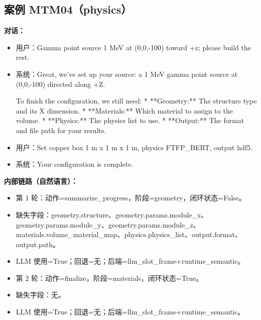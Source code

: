 \documentclass[11pt]{ctexart}
\begin{document}
\subsection{案例 MTM04（physics）}
\textbf{对话：}
\begin{itemize}
\item 用户：Gamma point source 1 MeV at (0,0,-100) toward +z; please build the rest.
\item 系统：Great, we've set up your source: a 1 MeV gamma point source at (0,0,-100) directed along +Z.

To finish the configuration, we still need:
*   **Geometry:** The structure type and its X dimension.
*   **Materials:** Which material to assign to the volume.
*   **Physics:** The physics list to use.
*   **Output:** The format and file path for your results.
\item 用户：Set copper box 1 m x 1 m x 1 m, physics FTFP\_BERT, output hdf5.
\item 系统：Your configuration is complete.
\end{itemize}
\textbf{内部链路（自然语言）：}
\begin{itemize}
\item 第 1 轮：动作=summarize\_progress，阶段=geometry，闭环状态=False。
\item 缺失字段：geometry.structure、geometry.params.module\_x、geometry.params.module\_y、geometry.params.module\_z、materials.volume\_material\_map、physics.physics\_list、output.format、output.path。
\item LLM 使用=True；回退=无；后端=llm\_slot\_frame+runtime\_semantic。
\item 第 2 轮：动作=finalize，阶段=materials，闭环状态=True。
\item 缺失字段：无。
\item LLM 使用=True；回退=无；后端=llm\_slot\_frame+runtime\_semantic。
\end{itemize}
\end{document}
